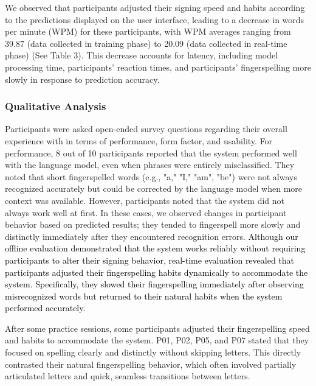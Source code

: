 We observed that participants adjusted their signing speed and habits according to the predictions displayed on the user interface, leading to a decrease in words per minute (WPM) for these participants, with WPM averages ranging from 39.87 (data collected in training phase) to 20.09 (data collected in real-time phase) (See Table 3). This decrease accounts for latency, including model processing time, participants' reaction times, and participants' fingerspelling more slowly in response to prediction accuracy.



\subsubsection{Qualitative Analysis}
Participants were asked open-ended survey questions regarding their overall experience with \theDevice{} in terms of performance, form factor, and usability. For performance, 8 out of 10 participants reported that the system performed well with the language model, even when phrases were entirely misclassified. They noted that short fingerspelled words (e.g., "a," "I," "am", "be") were not always recognized accurately but could be corrected by the language model when more context was available. However, participants noted that the system did not always work well at first. In these cases, we observed changes in participant behavior based on predicted results; they tended to fingerspell more slowly and distinctly immediately after they encountered recognition errors. \textcolor{black}{Although our offline evaluation demonstrated that the system works reliably without requiring participants to alter their signing behavior, real-time evaluation revealed that participants adjusted their fingerspelling habits dynamically to accommodate the system. Specifically, they slowed their fingerspelling immediately after observing misrecognized words but returned to their natural habits when the system performed accurately.}



After some practice sessions, some participants adjusted their fingerspelling speed and habits to accommodate the system. P01, P02, P05, and P07 stated that they focused on spelling clearly and distinctly without skipping letters. This directly contrasted their natural fingerspelling behavior, which often involved partially articulated letters and quick, seamless transitions between letters. 
